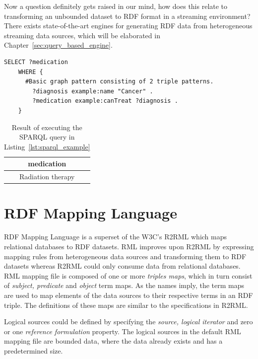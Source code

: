 Now a question definitely gets raised in our mind, how does this relate to transforming an 
unbounded dataset to RDF format in a streaming environment? There exists state-of-the-art 
engines for generating RDF data from heterogeneous streaming data sources, which will be 
elaborated in Chapter~\ref{sec:query_based_engine}. 

\begin{lstlisting}[language=SPARQL,
    caption={Example of a SPARQL query of a medication.}, 
    label={lst:sparql_example}]
    SELECT ?medication
    WHERE {
      #Basic graph pattern consisting of 2 triple patterns. 
        ?diagnosis example:name "Cancer" .
        ?medication example:canTreat ?diagnosis .
    }
\end{lstlisting}


\begin{table}[htbp]
    \centering
    \begin{tabular}{|c|}
    \hline
    \textbf{medication}        \\ \hline
    Radiation therapy \\ \hline
    \end{tabular}
    \caption{Result of executing the SPARQL query in Listing~\ref{lst:sparql_example}}
    \label{tab:sparql_result}
\end{table}


\section{RDF Mapping Language}
RDF Mapping Language\cite{rml} is a superset of the W3C's R2RML\cite{r2rml} which maps relational databases to
RDF datasets. RML improves upon R2RML by expressing mapping rules from heterogeneous
data sources and transforming them to RDF datasets whereas R2RML could only consume
data from relational databases. RML mapping file is composed of one or more \emph{triples maps}, 
which in turn consist of \emph{subject, predicate} and \emph{object} term maps. As the names imply, 
the term maps are used to map elements of the data sources to their respective terms 
in an RDF triple. The definitions of these maps are similar to the 
specifications in R2RML\cite{rml_tech}. 

Logical sources could be defined by specifying the \emph{source, logical iterator} 
and zero or one \emph{reference formulation} property. The logical sources in the default 
RML mapping file are bounded data, where the data already exists and has a predetermined
size. 

